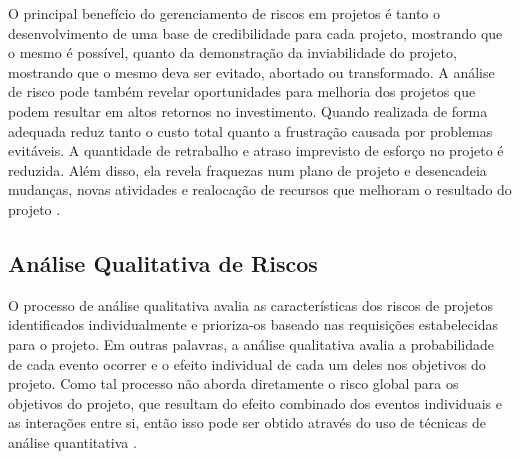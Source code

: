 O principal benefício do gerenciamento de riscos em projetos é tanto o desenvolvimento de uma base de credibilidade para cada projeto, mostrando que o mesmo é possível, quanto da demonstração da inviabilidade do projeto, mostrando que o mesmo deva ser evitado, abortado ou transformado. A análise de risco pode também revelar oportunidades para melhoria dos projetos que podem resultar em altos retornos no investimento. Quando realizada de forma adequada reduz tanto o custo total quanto a frustração causada por problemas evitáveis. A quantidade de retrabalho e atraso imprevisto de esforço no projeto é reduzida. Além disso, ela revela fraquezas num plano de projeto e desencadeia mudanças, novas atividades e realocação de recursos que melhoram o resultado do projeto \cite{kendrick2003identifying}.

\subsection{Análise Qualitativa de Riscos}

O processo de análise qualitativa avalia as características dos riscos de projetos identificados individualmente e prioriza-os baseado nas requisições estabelecidas para o projeto. Em outras palavras, a análise qualitativa avalia a probabilidade de cada evento ocorrer e o efeito individual de cada um deles nos objetivos do projeto. Como tal processo não aborda diretamente o risco global para os objetivos do projeto, que resultam do efeito combinado dos eventos individuais e as interações entre si, então isso pode ser obtido através do uso de técnicas de análise quantitativa \cite{PRACTICESTANDARD2009}.

